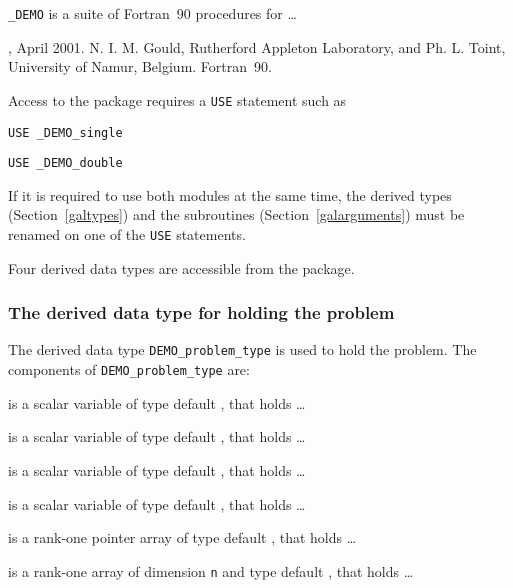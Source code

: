 \documentclass{galahad}
\newcommand{\packagename}{DEMO}
\newcommand{\fullpackagename}{\libraryname\_\packagename}
\begin{document}
\galheader


\galsummary

{\tt \fullpackagename} is a suite of Fortran~90 procedures for \ldots


\galattributes
\galversions{\tt  \fullpackagename\_single, \fullpackagename\_double},
\galdate April 2001.
\galorigin N. I. M. Gould, Rutherford Appleton Laboratory, and
Ph. L. Toint, University of Namur, Belgium.
\gallanguage Fortran~90. 


\galhowto

Access to the package requires a {\tt USE} statement such as

\medskip{}

\hspace{8mm} {\tt USE \fullpackagename\_single}

\medskip{}

\hspace{8mm} {\tt USE  \fullpackagename\_double}

\medskip

If it is required to use both modules at the same time, the derived types 
(Section~\ref{galtypes})
and the subroutines
(Section~\ref{galarguments})
must be renamed on one of the {\tt USE} statements.


\galtypes
Four derived data types are accessible from the package.


\subsubsection{The derived data type for holding the problem}\label{typeprob}
The derived data type {\tt \packagename\_problem\_type} is used to hold 
the problem. The components of 
{\tt \packagename\_problem\_type} 
are:

\begin{description}

 is a scalar variable of type default \integer, that holds \ldots

 is a scalar variable of type default \logical, that holds \ldots

 is a scalar variable of type default \real, that holds \ldots

 is a scalar variable of type default \realdp, that holds \ldots

 is a rank-one pointer array of type default \realdp, that holds \ldots

 is a rank-one array of dimension {\tt n} and type 
default \realdp, that holds \ldots

\end{description}
\end{document}
